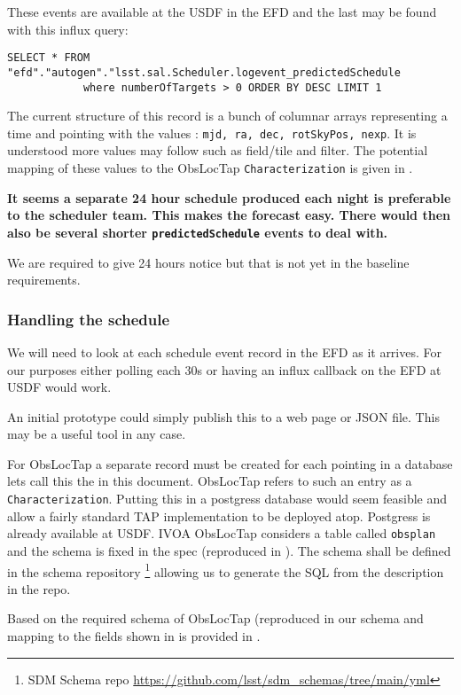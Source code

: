 These events are available at the USDF in the EFD and the last may be found with this influx query:
\begin{lstlisting}
SELECT * FROM "efd"."autogen"."lsst.sal.Scheduler.logevent_predictedSchedule
            where numberOfTargets > 0 ORDER BY DESC LIMIT 1
\end{lstlisting}

The current structure of this record is a bunch of columnar arrays representing a time and pointing with the
values : \texttt{mjd, ra, dec, rotSkyPos, nexp}.
It is understood more values may follow such as field/tile and filter.
The potential mapping of these values to the ObsLocTap \texttt{Characterization} is given in .


{\bf It seems a separate 24 hour schedule produced each night is preferable to the scheduler team. This makes the forecast easy. There would then also be several shorter \texttt{predictedSchedule} events to deal with. }

We are required to give 24 hours notice but that is not yet in the  baseline requirements.
\subsubsection{Handling the schedule}
We will need to look at each schedule event record in the EFD as it arrives.
For our purposes either polling each 30s or having an influx callback on the EFD at USDF would
work.

An initial prototype could simply publish this to a web page or JSON file.
This may be a useful tool in any case.


For ObsLocTap a separate record must be created for each pointing in a database lets call this the \DB in this document.
ObsLocTap refers to such an entry as a \texttt{ Characterization}.
Putting this in a postgress database would seem feasible and allow a fairly standard TAP implementation to be deployed atop.
Postgress is already available at USDF.
IVOA ObsLocTap considers a table called \texttt{obsplan} and the schema is fixed in the spec (reproduced in ).
The schema shall be  defined in the schema repository
\footnote{ SDM Schema repo \url{https://github.com/lsst/sdm_schemas/tree/main/yml}}
 allowing us to generate the SQL from the description in the repo.

Based on the required schema of ObsLocTap (reproduced in  our schema and mapping to the fields shown in  is provided in .

